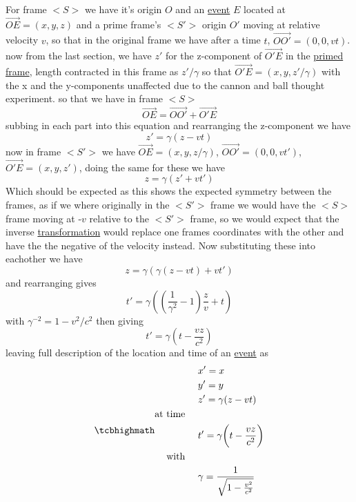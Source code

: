For frame $<S>$ we have it's origin $O$ and an \hyperlink{def-event}{event} $E$ located at $\overrightarrow{OE}=(x,y,z)$ and a prime frame's $<S'>$ origin $O'$ moving at relative velocity $v$, so that in the original frame we have after a time $t$, $\overrightarrow{OO'}=(0,0,vt)$. now from the last section, we have $z'$ for the z-component of $\overrightarrow{O'E}$ in the \hyperlink{def-Primed-Frame}{primed frame}, length contracted in this frame as $z'/\gamma$ so that $\overrightarrow{O'E} = (x,y,z'/\gamma)$ with the x and the y-components unaffected due to the cannon and ball thought experiment.
so that we have in frame $<S>$
\begin{equation}%
    \overrightarrow{OE}= \overrightarrow{OO'} + \overrightarrow{O'E}
\label{eq: event}
\end{equation}%
subbing in each part into this equation and rearranging the z-component we have 
\begin{equation}%
    z' = \gamma (z-vt)
\end{equation}%
now in frame $<S'>$ we have $\overrightarrow{OE}=(x,y,z/\gamma)$, $\overrightarrow{OO'}=(0,0,vt')$, $\overrightarrow{O'E} = (x,y,z')$, doing the same for these we have 
\begin{equation}%
    z = \gamma (z'+vt')
\end{equation}%
Which should be expected as this shows the expected symmetry between the frames, as if we where originally in the $<S'>$ frame we would have the $<S>$ frame moving at -$v$ relative to the $<S'>$ frame, so we would expect that the inverse \hyperlink{def-transform}{transformation} would replace one frames coordinates with the other and have the the negative of the velocity instead.
Now substituting these into eachother we have
\begin{equation}%
    z = \gamma ( \gamma (z-vt)+vt')
\end{equation}%
and rearranging gives
\begin{equation}%
    t' = \gamma \left( \left( \dfrac{1}{\gamma^2}-1 \right)\frac{z}{v} + t \right)
\end{equation}%
with $\gamma^{-2}=1-v^2/c^2$ then giving
\begin{equation}%
    t' = \gamma \left( t - \dfrac{vz}{c^2} \right)
\end{equation}%
leaving full description of the location and time of an \hyperlink{def-event}{event} as
\begin{equation}%
\mhl{
    \begin{aligned}
      &  x'=x \\ & y'=y \\ &z' = \gamma (z-vt)  \\ 
      \text{at time \ \ \ } \\
      & t'=\gamma \bigg(t-\frac{vz}{c^2}\bigg)  \\
      \text{with \ \ \ } \\
      &  \gamma = \dfrac{1}{\sqrt{1-\frac{v^2}{c^2}}}
    \end{aligned}
    } 
    \label{eq: Lorentz transformation}
\end{equation}%

